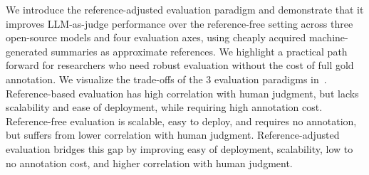 We introduce the reference-adjusted evaluation paradigm and demonstrate that
it improves LLM-as-judge performance over the reference-free setting across
three open-source models and four evaluation axes, using cheaply acquired
machine-generated summaries as approximate references. We highlight a practical path forward for researchers who need robust evaluation without the cost of full gold annotation. We visualize the trade-offs of the 3 evaluation paradigms in~. Reference-based evaluation has high correlation with human judgment, but lacks scalability and ease of deployment, while requiring high annotation cost. Reference-free evaluation is scalable, easy to deploy, and requires no annotation, but suffers from lower correlation with human judgment. Reference-adjusted evaluation bridges this gap by improving easy of deployment, scalability, low to no annotation cost, and higher correlation with human judgment. 